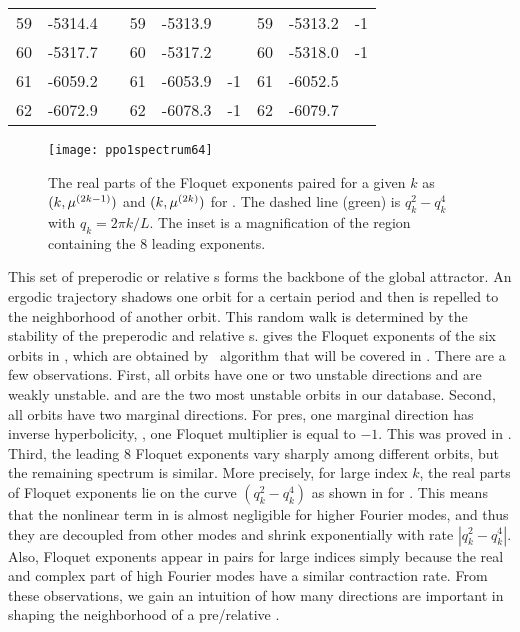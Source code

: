 \begin{table}[!ht]
\begin{tabular}{l l c | l l c | l l c}
    59 &   -5314.4 &                     &  59  &         -5313.9  &                      & 59  &    -5313.2     &  -1                  \\
    60 &   -5317.7 &                     &  60  &         -5317.2  &                      & 60  &    -5318.0     &  -1                  \\
    61 &   -6059.2 &                     &  61  &         -6053.9  &    -1                & 61  &    -6052.5     &                      \\
    62 &   -6072.9 &                     &  62  &         -6078.3  &    -1                & 62  &    -6079.7     &                      \\
    \hline
  \end{tabular}
\end{table}

\begin{figure}[ht]
  \centering
  \texttt{[image: ppo1spectrum64]}
  \caption[Floquet spectrum of .]{
    The real parts of the Floquet exponents paired for a given $k$ as
    $(k,\eigRe[2k-1])$ and $(k,\eigRe[2k])$ for .
    The dashed line (green) is
    $q_{k}^{2}-q_{k}^{4}$ with $q_k = 2\pi k/L$.
    The inset is a magnification of the region
    containing the 8 leading exponents.
  }
  \label{fig:ppo1spect}
\end{figure}

This set of preperodic or relative \po s forms the backbone of the global attractor. An ergodic
trajectory shadows one orbit for a certain period and then is repelled to the neighborhood of
another orbit. This random walk is determined by the stability of the preperodic and relative
\po s.
 gives the Floquet exponents of the six orbits in ,
which are obtained by \ped\ algorithm that will be covered in .
There are a few observations. First, all orbits have one or two unstable directions and
are weakly unstable.  and  are the two most unstable orbits
in our database.
Second, all orbits have
two marginal directions. For pre\po s, one marginal direction has inverse hyperbolicity, \ie,
one Floquet multiplier is equal to $-1$. This was proved in .
Third, the leading 8 Floquet exponents vary sharply among different orbits, but the remaining
spectrum is similar. More precisely, for large index $k$, the real parts of
Floquet exponents lie
on the curve $(q_k^2 - q_k^4 )$ as shown in  for .
This means that the nonlinear term in  is almost negligible for higher
Fourier modes, and thus they are decoupled from other modes and shrink exponentially with
rate $|q_k^2 - q_k^4 |$.
Also, Floquet exponents appear in pairs for large indices simply because
the real and complex part of high Fourier modes have a similar contraction
rate.
From these observations, we gain an intuition of how many directions
are important in shaping the neighborhood of a pre/relative \po.
